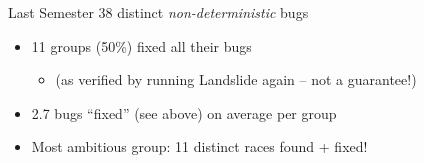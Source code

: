 \documentclass[xcolor=dvipsnames]{beamer}
\begin{document}
\begin{frame}{Last Semester}
	38 distinct {\em non-deterministic} bugs
	\begin{itemize}
		\item 11 groups (50\%) fixed all their bugs
			\begin{itemize}
				\item (as verified by running Landslide again -- not a guarantee!)
			\end{itemize}
		\item 2.7 bugs ``fixed'' (see above) on average per group
		\item Most ambitious group: 11 distinct races found + fixed!
	\end{itemize}
\end{frame}

%
%	
%


\end{document}
